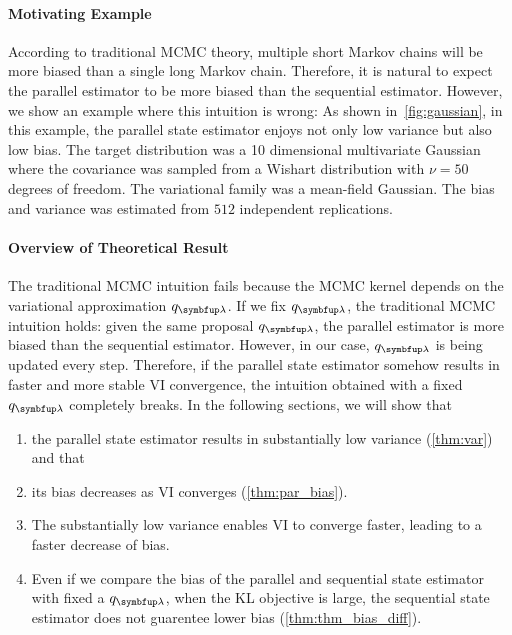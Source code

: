 \paragraph{Motivating Example}
According to traditional MCMC theory, multiple short Markov chains will be more biased than a single long Markov chain.
Therefore, it is natural to expect the parallel estimator to be more biased than the sequential estimator.
However, we show an example where this intuition is wrong: As shown in~\cref{fig:gaussian}, in this example, the parallel state estimator enjoys not only low variance but also low bias.
The target distribution was a 10 dimensional multivariate Gaussian where the covariance was sampled from a Wishart distribution with \(\nu = 50\) degrees of freedom.
The variational family was a mean-field Gaussian.
The bias and variance was estimated from \(512\) independent replications.

\vspace{-0.05in}
\paragraph{Overview of Theoretical Result}
The traditional MCMC intuition fails because the MCMC kernel depends on the variational approximation \(q_{\vlambda}\).
If we fix \(q_{\vlambda}\), the traditional MCMC intuition holds: given the same proposal \(q_{\vlambda}\), the parallel estimator is more biased than the sequential estimator.
However, in our case, \(q_{\vlambda}\) is being updated every step.
Therefore, if the parallel state estimator somehow results in faster and more stable VI convergence, the intuition obtained with a fixed \(q_{\vlambda}\) completely breaks.
In the following sections, we will show that 
\vspace{-0.05in}
\begin{enumerate}[noitemsep]
  \item[\ding{182}] the parallel state estimator results in substantially low variance (\cref{thm:var}) and that
  \item[\ding{183}] its bias decreases as VI converges (\cref{thm:par_bias}).
  \item[\ding{184}] The substantially low variance enables VI to converge faster, leading to a faster decrease of bias.
  \item[\ding{185}] Even if we compare the bias of the parallel and sequential state estimator with fixed a \(q_{\vlambda}\), when the KL objective is large, the sequential state estimator does not guarentee lower bias (\cref{thm:thm_bias_diff}).
\end{enumerate}
\vspace{-0.05in}


